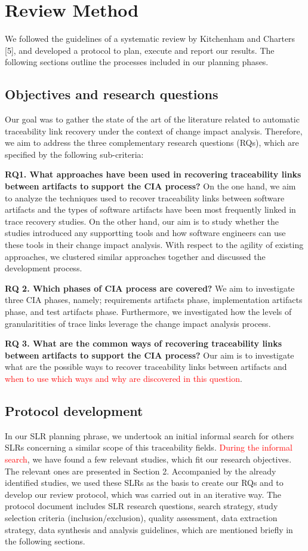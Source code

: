\documentclass[conference]{IEEEtran}
\begin{document}
\section{Review Method}
We followed the guidelines of a systematic review by Kitchenham and Charters [5], and developed a protocol to plan, execute and report our results. The following sections outline the processes included in our planning phases.
\subsection{Objectives and research questions}
Our goal was to gather the state of the art of the literature related to automatic traceability link recovery under the context of change impact analysis. Therefore, we aim to address the three complementary research questions (RQs), which are specified by the following sub-criteria: 

\textbf{RQ1. What approaches have been used in recovering traceability links between artifacts to support the CIA process? }
On the one hand, we aim to analyze the techniques used to recover traceability links between software artifacts and the types of software artifacts have been most frequently linked in trace recovery studies. On the other hand, our aim is to study whether the studies introduced any supportting tools and how software engineers can use these tools in their change impact analysis. With respect to the agility of existing approaches, we clustered similar approaches together and discussed the development process.

\textbf{RQ 2. Which phases of CIA process are covered? }
We aim to investigate three CIA phases, namely; requirements artifacts phase, implementation artifacts phase, and test artifacts phase. Furthermore, we investigated how the levels of granularitities of trace links leverage the change impact analysis process.

\textbf{RQ 3. What are the common ways of recovering traceability links between artifacts to support the CIA process? }
Our aim is to investigate what are the possible ways to recover traceability links between artifacts and \textcolor{red}{when to use which ways and why are discovered in this question}. 

\subsection{Protocol development}
In our SLR planning phrase, we undertook an initial informal search for others SLRs concerning a similar scope of this traceability fields. \textcolor{red}{During the informal search}, we have found a few relevant studies, which fit our research objectives. The relevant ones are presented in Section 2. Accompanied by the already identified studies, we used these SLRs as the basis to create our RQs and to develop our review protocol, which was carried out in an iterative way. The protocol document includes SLR research questions, search strategy, study selection criteria (inclusion/exclusion), quality assessment, data extraction strategy, data synthesis and analysis guidelines, which are mentioned briefly in the following sections.
\end{document}
